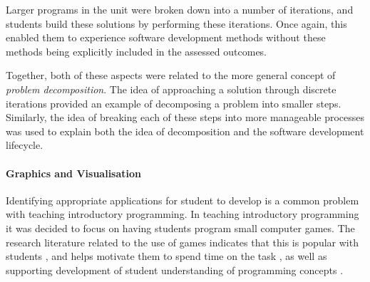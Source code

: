 Larger programs in the unit were broken down into a number of iterations, and students build these solutions by performing these iterations. Once again, this enabled them to experience software development methods without these methods being explicitly included in the assessed outcomes.

Together, both of these aspects were related to the more general concept of \emph{problem decomposition}. The idea of approaching a solution through discrete iterations provided an example of decomposing a problem into smaller steps. Similarly, the idea of breaking each of these steps into more manageable processes was used to explain both the idea of decomposition and the software development lifecycle. 


\paragraph{Graphics and Visualisation} %
\label{par:graphics_and_visualisation}

Identifying appropriate applications for student to develop is a common problem with teaching introductory programming. In teaching introductory programming it was decided to focus on having students program small computer games. The research literature related to the use of games indicates that this is popular with students \cite{Bayliss:2006}, and helps motivate them to spend time on the task \cite{Feldgen:2004,Rajaravivarma:2005,Cliburn:2006}, as well as supporting development of student understanding of programming concepts \cite{Roberts:1995,Leutenegger:2007}.




